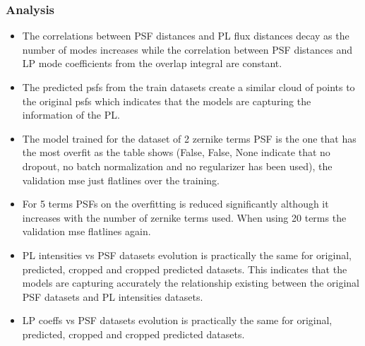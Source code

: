 	\subsubsection{Analysis}
		\begin{itemize}
			\item The correlations between PSF distances and PL flux distances decay as the number of modes increases while the correlation between PSF distances and LP mode coefficients from the overlap integral are constant.
			\item The predicted psfs from the train datasets create a similar cloud of points to the original psfs which indicates that the models are capturing the information of the PL.
			\item The model trained for the dataset of 2 zernike terms PSF is the one that has the most overfit as the table shows (False, False, None indicate that no dropout, no batch normalization and no regularizer has been used), the validation mse just flatlines over the training.
			
			\item For 5 terms PSFs on the overfitting is reduced significantly although it increases with the number of zernike terms used. When using 20 terms the validation mse flatlines again.
			
			\item PL intensities vs PSF datasets evolution is practically the same for original, predicted, cropped and cropped predicted datasets. This indicates that the models are capturing accurately the relationship existing between the original PSF datasets and PL intensities datasets.
			
			\item LP coeffs vs PSF datasets evolution is practically the same for original, predicted, cropped and cropped predicted datasets.
		\end{itemize}
    
    
     
		\FloatBarrier